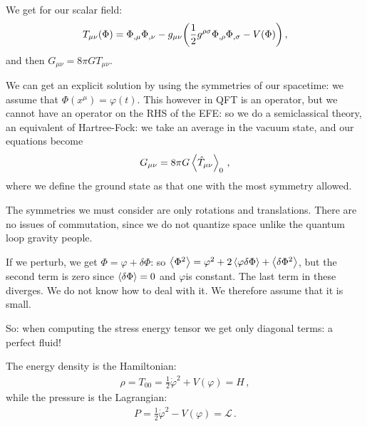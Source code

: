 \documentclass[main.tex]{subfiles}
\begin{document}
We get for our scalar field: 
%
\begin{align}
  T_{\mu \nu } (\Phi ) = \Phi_{,  \mu } \Phi_{, \nu } - g_{\mu \nu } \qty(\frac{1}{2} g^{\rho \sigma } \Phi_{, \rho } \Phi_{, \sigma } - V(\Phi ))
\,,
\end{align}
%
and then \(G_{\mu \nu } = 8 \pi G T_{\mu \nu }\).

We can get an explicit solution by using the symmetries of our spacetime: we assume that \(\Phi (x^{\mu }) = \varphi (t)\).
This however in QFT is an operator, but we cannot have an operator on the RHS of the EFE: so we do a semiclassical theory, an equivalent of Hartree-Fock: we take an average in the vacuum state, and our equations become 
%
\begin{align}
  G_{\mu \nu } = 8 \pi G \expval{\hat{T}_{\mu \nu } }_{0}
\,,
\end{align}
%
where we define the ground state as that one with the most symmetry allowed.

The symmetries we must consider are only rotations and translations.
There are no issues of commutation, since we do not quantize space unlike the quantum loop gravity people.

If we perturb, we get \(\Phi = \varphi + \delta \Phi \): so \(\expval{\Phi^2 } = \varphi^2 + 2 \expval{\varphi \delta \Phi } + \expval{ \delta \Phi^2}\), but the second term is zero since \(\expval{ \delta \Phi } = 0 \) and \(\varphi \)is constant.
The last term in these diverges. We do not know how to deal with it.
We therefore assume that it is small.

So: when computing the stress energy tensor we get only diagonal terms: a perfect fluid!

The energy density is the Hamiltonian:
%
\begin{align}
  \rho = T_{00 } = \frac{1}{2} \dot{\varphi }^2 + V(\varphi ) = H
\,,
\end{align}
%
while the pressure is the Lagrangian: 
%
\begin{align}
  P = \frac{1}{2} \dot{\varphi}^2 - V(\varphi ) = \mathscr{L}
\,.
\end{align}
\end{document}

